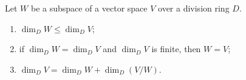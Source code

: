 Let $W$ be a subspace of a vector space $V$ over a division ring $D$.
\begin{enumerate}
\item[(i)] $\dim_D W \leq \dim_D V$;
\item[(ii)] if $\dim_D W = \dim_D V$ and $\dim_D V$ is finite, then $W = V$;
\item[(iii)] $\dim_D V = \dim_D W + \dim_D(V/W)$.
\end{enumerate}
